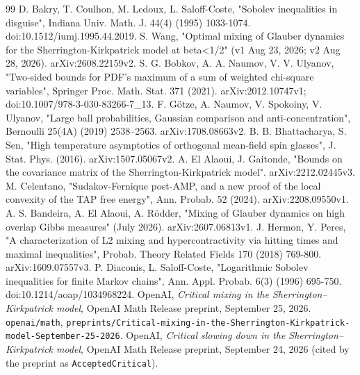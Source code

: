 \documentclass[11pt]{article}
\begin{document}
\begin{thebibliography}{99}
 D. Bakry, T. Coulhon, M. Ledoux, L. Saloff-Coste, "Sobolev inequalities in disguise", Indiana Univ. Math. J. 44(4) (1995) 1033-1074. doi:10.1512/iumj.1995.44.2019.
 S. Wang, "Optimal mixing of Glauber dynamics for the Sherrington-Kirkpatrick model at beta<1/2" (v1 Aug 23, 2026; v2 Aug 28, 2026). arXiv:2608.22159v2.
 S. G. Bobkov, A. A. Naumov, V. V. Ulyanov, "Two-sided bounds for PDF's maximum of a sum of weighted chi-square variables", Springer Proc. Math. Stat. 371 (2021). arXiv:2012.10747v1; doi:10.1007/978-3-030-83266-7\_13.
 F. Götze, A. Naumov, V. Spokoiny, V. Ulyanov, "Large ball probabilities, Gaussian comparison and anti-concentration", Bernoulli 25(4A) (2019) 2538--2563. arXiv:1708.08663v2.
 B. B. Bhattacharya, S. Sen, "High temperature asymptotics of orthogonal mean-field spin glasses", J. Stat. Phys. (2016). arXiv:1507.05067v2.
 A. El Alaoui, J. Gaitonde, "Bounds on the covariance matrix of the Sherrington-Kirkpatrick model". arXiv:2212.02445v3.
 M. Celentano, "Sudakov-Fernique post-AMP, and a new proof of the local convexity of the TAP free energy", Ann. Probab. 52 (2024). arXiv:2208.09550v1.
 A. S. Bandeira, A. El Alaoui, A. Rödder, "Mixing of Glauber dynamics on high overlap Gibbs measures" (July 2026). arXiv:2607.06813v1.
 J. Hermon, Y. Peres, "A characterization of L2 mixing and hypercontractivity via hitting times and maximal inequalities", Probab. Theory Related Fields 170 (2018) 769-800. arXiv:1609.07557v3.
 P. Diaconis, L. Saloff-Coste, "Logarithmic Sobolev inequalities for finite Markov chains", Ann. Appl. Probab. 6(3) (1996) 695-750. doi:10.1214/aoap/1034968224.
 OpenAI, \emph{Critical mixing in the Sherrington--Kirkpatrick model}, OpenAI Math Release preprint, September 25, 2026. \texttt{openai/math}, \texttt{preprints/Critical-mixing-in-the-Sherrington-Kirkpatrick-model-September-25-2026}.
 OpenAI, \emph{Critical slowing down in the Sherrington--Kirkpatrick model}, OpenAI Math Release preprint, September 24, 2026 (cited by the preprint as \texttt{AcceptedCritical}).

\end{thebibliography}
\end{document}
